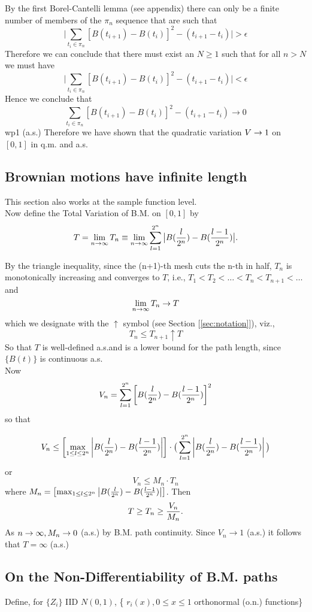 By the first Borel-Cantelli lemma (see appendix) there can only be a finite number of members of the $\pi_n$ sequence that are such that 
$$\Big| \sum_{t_i \in \pi_n}  \left[ B(t_{i+1}) - B(t_i)\right]^2 - (t_{i+1} - t_i) \Big| > \epsilon $$ Therefore we can conclude that there must exist an $N \ge 1$ such that for all $n>N$ we must have
$$\big| \sum_{t_i \in \pi_n}  \left[ B(t_{i+1}) - B(t_i)\right]^2 - (t_{i+1} - t_i) \big|  < \epsilon$$ Hence we conclude that 
$$\sum_{t_i \in \pi_n}          \left[ B(t_{i+1}) - B(t_i)\right]^2 - (t_{i+1} - t_i) \rightarrow 0$$ wp1 (a.s.) Therefore we have shown that the quadratic variation $V\rightarrow1$ on $[0,1]$ in q.m. and a.s. 
 
\subsection{Brownian motions have infinite length}

This section also works at the sample function level. \\

Now define the Total Variation of B.M. on $[0,1]$ by $$T = \lim_{n\rightarrow\infty} T_n \equiv \lim_{n\rightarrow\infty} \sum_{l=1}^{2^n} \big| B({l\over 2^n}) - B({l-1\over2^n})\big|.$$

By the triangle inequality, since the (n+1)-th mesh cuts the n-th in half, $T_n$ is monotonically increasing and converges to $T$, i.e., $T_1 < T_2< \hdots < T_n < T_{n+1} < \hdots $ and $$\lim_{n\rightarrow\infty} T_n \to T$$ which we designate with the $\uparrow$ symbol (see Section [\ref{sec:notation}]), viz., 
$$T_n \le T_{n+1} \uparrow T$$ So that $T$ is well-defined a.s.and is a lower bound for the path length, since $\{ B(t) \}$ is continuous a.s. \\ Now $$V_n = \sum_{l=1}^{2^n} \left[ B({l\over2^n}) - B({l-1\over2^n})\right]^2$$ so that

$$V_n \le \left[\max_{1\le l \le 2^n} \left| B({l\over2^n}) - B({l-1\over2^n}) \right|\right] \cdot \big(\sum_{l=1}^{2^n} \left| B({l\over2^n}) - B({l-1\over2^n})  \right| \big)$$ or 
$$V_n \le M_n\cdot T_n$$where $M_n = \left[\max_{1\le l \le 2^n} \left| B({l\over2^n}) - B({l-1\over2^n}) \right|\right]$. Then $$T \ge T_n \ge {V_n\over M_n}.$$ As $n\rightarrow\infty, M_n \rightarrow 0$ (a.s.) by B.M. path continuity. Since $V_n \rightarrow 1$ (a.s.) it follows that $T = \infty$ (a.s.)\\

\subsection{On the Non-Differentiability of B.M. paths}
Define, for $\{Z_i\}$ IID $N(0,1)$, \{ $r_i(x), 0\le x \le 1$ orthonormal (o.n.) functions\}

